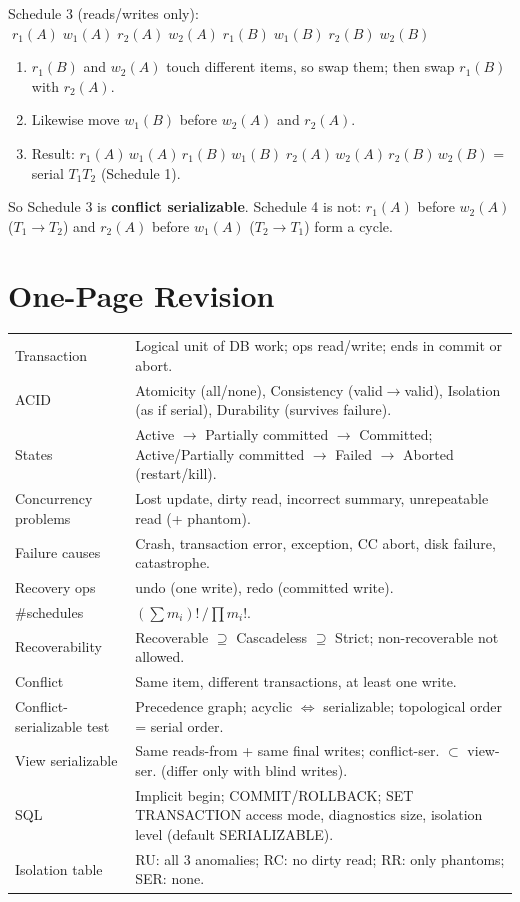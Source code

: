 \documentclass[10pt,a4paper]{article}
\begin{document}
\begin{exbox}
\small
Schedule 3 (reads/writes only): $\;r_1(A)\;w_1(A)\;r_2(A)\;w_2(A)\;r_1(B)\;w_1(B)\;r_2(B)\;w_2(B)$
\begin{enumerate}
  \item $r_1(B)$ and $w_2(A)$ touch different items, so swap them; then swap $r_1(B)$ with $r_2(A)$.
  \item Likewise move $w_1(B)$ before $w_2(A)$ and $r_2(A)$.
  \item Result: $r_1(A)\,w_1(A)\,r_1(B)\,w_1(B)\;r_2(A)\,w_2(A)\,r_2(B)\,w_2(B)$ = serial $T_1T_2$ (Schedule 1).
\end{enumerate}
So Schedule 3 is \textbf{conflict serializable}. Schedule 4 is not: $r_1(A)$ before $w_2(A)$ ($T_1\to T_2$) and $r_2(A)$ before $w_1(A)$ ($T_2\to T_1$) form a cycle.
\end{exbox}

\section{One-Page Revision}

\begin{tabularx}{\linewidth}{@{}p{3.6cm} X@{}}
\toprule
Transaction & Logical unit of DB work; ops read/write; ends in commit or abort.\\
ACID & Atomicity (all/none), Consistency (valid$\to$valid), Isolation (as if serial), Durability (survives failure).\\
States & Active $\to$ Partially committed $\to$ Committed; Active/Partially committed $\to$ Failed $\to$ Aborted (restart/kill).\\
Concurrency problems & Lost update, dirty read, incorrect summary, unrepeatable read (+ phantom).\\
Failure causes & Crash, transaction error, exception, CC abort, disk failure, catastrophe.\\
Recovery ops & undo (one write), redo (committed write).\\
\#schedules & $(\sum m_i)!\,/\prod m_i!$.\\
Recoverability & Recoverable $\supseteq$ Cascadeless $\supseteq$ Strict; non-recoverable not allowed.\\
Conflict & Same item, different transactions, at least one write.\\
Conflict-serializable test & Precedence graph; acyclic $\Leftrightarrow$ serializable; topological order = serial order.\\
View serializable & Same reads-from + same final writes; conflict-ser. $\subset$ view-ser. (differ only with blind writes).\\
SQL & Implicit begin; COMMIT/ROLLBACK; SET TRANSACTION access mode, diagnostics size, isolation level (default SERIALIZABLE).\\
Isolation table & RU: all 3 anomalies; RC: no dirty read; RR: only phantoms; SER: none.\\
\bottomrule
\end{tabularx}
\end{document}
